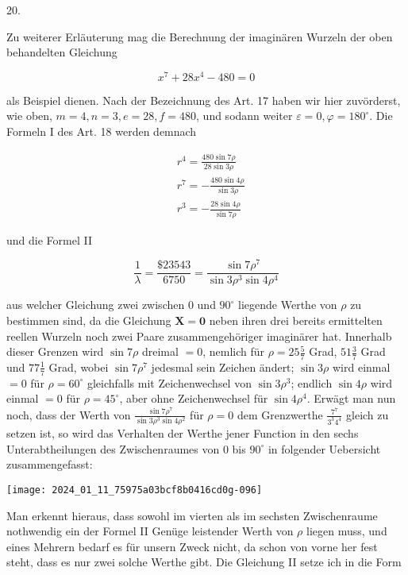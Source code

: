 \documentclass[10pt]{article}
\begin{document}
20.

Zu weiterer Erläuterung mag die Berechnung der imaginären Wurzeln der oben behandelten Gleichung

\[
x^{7}+28 x^{4}-480=0
\]

als Beispiel dienen. Nach der Bezeichnung des Art. 17 haben wir hier zuvörderst, wie oben, \(m=4, n=3, e=28, f=480\), und sodann weiter \(\varepsilon=0, \varphi=180^{\circ}\). Die Formeln I des Art. 18 werden demnach

\[
\begin{aligned}
& r^{4}=\frac{480 \sin 7 \rho}{28 \sin 3 \rho} \\
& r^{7}=-\frac{480 \sin 4 \rho}{\sin 3 \rho} \\
& r^{3}=-\frac{28 \sin 4 \rho}{\sin 7 \rho}
\end{aligned}
\]

und die Formel II

\[
\frac{1}{\lambda}=\frac{\$ 23543}{6750}=\frac{\sin 7 \rho^{7}}{\sin 3 \rho^{3} \sin 4 \rho^{4}}
\]

aus welcher Gleichung zwei zwischen 0 und \(90^{\circ}\) liegende Werthe von \(\rho\) zu bestimmen sind, da die Gleichung \(\boldsymbol{X}=\mathbf{0}\) neben ihren drei bereits ermittelten reellen Wurzeln noch zwei Paare zusammengehöriger imaginärer hat. Innerhalb dieser Grenzen wird \(\sin 7 \rho\) dreimal \(=0\), nemlich für \(\rho=25 \frac{5}{7}\) Grad, \(51 \frac{3}{7}\) Grad und \(77 \frac{1}{7}\) Grad, wobei \(\sin 7 \rho^{7}\) jedesmal sein Zeichen ändert; \(\sin 3 \rho\) wird einmal \(=0\) für \(\rho=60^{\circ}\) gleichfalls mit Zeichenwechsel von \(\sin 3 \rho^{3}\); endlich \(\sin 4 \rho\) wird einmal \(=0\) für \(\rho=45^{\circ}\), aber ohne Zeichenwechsel für \(\sin 4 \rho^{4}\). Erwägt man nun noch, dass der Werth von \(\frac{\sin 7 \rho^{7}}{\sin 3 \rho^{3} \sin 4 \rho^{2}}\) für \(\rho=0\) dem Grenzwerthe \(\frac{7^{7}}{3^{3} 4^{4}}\) gleich zu setzen ist, so wird das Verhalten der Werthe jener Function in den sechs Unterabtheilungen des Zwischenraumes von 0 bis \(90^{\circ}\) in folgender Uebersicht zusammengefasst:

\begin{center}
\texttt{[image: 2024\_01\_11\_75975a03bcf8b0416cd0g-096]}
\end{center}

Man erkennt hieraus, dass sowohl im vierten als im sechsten Zwischenraume nothwendig ein der Formel II Genüge leistender Werth von \(\rho\) liegen muss, und eines Mehrern bedarf es für unsern Zweck nicht, da schon von vorne her fest steht, dass es nur zwei solche Werthe gibt. Die Gleichung II setze ich in die Form
\end{document}
